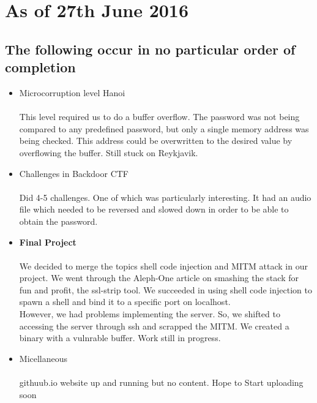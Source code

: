 \documentclass{article}
\begin{document}
\newpage
\section*{As of 27th June 2016}
\subsection*{The following occur in no particular order of completion}
\begin{itemize}
    \item Microcorruption level Hanoi
        \paragraph{}
        This level required us to do a buffer overflow. The password was not being compared to any predefined password, but only a single memory address was being checked. This address could be overwritten to the desired value by overflowing the buffer. Still stuck on Reykjavik.
    \item Challenges in Backdoor CTF
        \paragraph{}
        Did 4-5 challenges. One of which was particularly interesting. It had an audio file which needed to be reversed and slowed down in order to be able to obtain the password.
    \item \textbf{Final Project}
        \paragraph{}
        We decided to merge the topics shell code injection and MITM attack in our project. We went through the Aleph-One article on smashing the stack for fun and profit, the ssl-strip tool. We succeeded in using shell code injection to spawn a shell and bind it to a specific port on localhost. 
        \\
        However, we had problems implementing the server. So, we shifted to accessing the server through ssh and scrapped the MITM. We created a binary with a vulnrable buffer. Work still in progress.
    \item Micellaneous
        \paragraph{}
        githuub.io website up and running but no content. Hope to Start uploading soon
\end{itemize}
\end{document}
